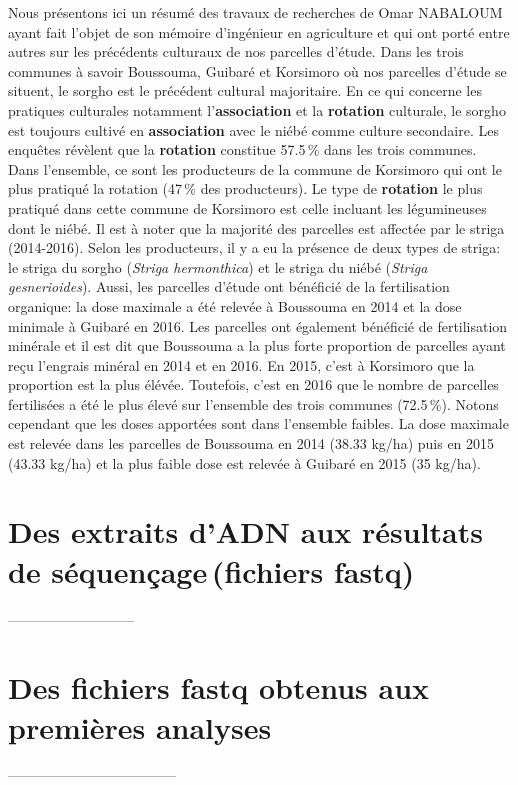 \documentclass[a4paper,11pt]{article}
\begin{document}
Nous présentons ici un résumé des travaux de recherches de Omar NABALOUM
ayant fait l'objet de son mémoire d'ingénieur en agriculture et qui ont
porté entre autres sur les précédents culturaux de nos parcelles
d'étude.  Dans les trois communes à savoir Boussouma, Guibaré et
Korsimoro où nos parcelles d'étude se situent, le sorgho est le
précédent cultural majoritaire.  En ce qui concerne les pratiques
culturales notamment l'\textbf{association} et la \textbf{rotation}
culturale, le sorgho est toujours cultivé en \textbf{association} avec
le niébé comme culture secondaire.  Les enquêtes révèlent que la
\textbf{rotation} constitue 57.5\,\% dans les trois communes. Dans
l'ensemble, ce sont les producteurs de la commune de Korsimoro qui ont
le plus pratiqué la rotation (47\,\% des producteurs). Le type de
\textbf{rotation} le plus pratiqué dans cette commune de Korsimoro est
celle incluant les légumineuses dont le niébé.  Il est à noter que la
majorité des parcelles est affectée par le striga (2014-2016). Selon
les producteurs, il y a eu la présence de deux types de striga: le
striga du sorgho (\emph{Striga hermonthica}) et le striga du niébé
(\emph{Striga gesnerioides}). Aussi, les parcelles d'étude ont
bénéficié de la fertilisation organique: la dose maximale a été
relevée à Boussouma en 2014 et la dose minimale à Guibaré en 2016. Les
parcelles ont également bénéficié de fertilisation minérale et il est
dit que Boussouma a la plus forte proportion de parcelles ayant reçu
l'engrais minéral en 2014 et en 2016. En 2015, c'est à Korsimoro que
la proportion est la plus élévée. Toutefois, c'est en 2016 que le
nombre de parcelles fertilisées a été le plus élevé sur l'ensemble des
trois communes (72.5\,\%).  Notons cependant que les doses apportées
sont dans l'ensemble faibles. La dose maximale est relevée dans les
parcelles de Boussouma en 2014 (38.33 kg/ha) puis en 2015 (43.33
kg/ha) et la plus faible dose est relevée à Guibaré en 2015 (35
kg/ha).

\section{Des extraits d'ADN aux résultats de séquençage\,(fichiers fastq)}
 ---------------------------
\section{Des fichiers fastq obtenus aux premières analyses}
------------------------------------ 

\end{document}
